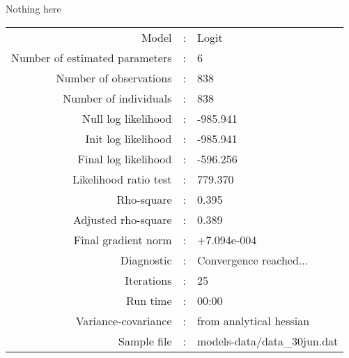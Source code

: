 Nothing here\\


\begin{flushleft}
\begin{tabular}{rcl}
\hline
Model &:& Logit\\
Number of estimated parameters&:&6\\
Number of  observations &:& 838\\
Number of individuals&:&838\\
Null log likelihood&:&-985.941\\
Init log likelihood&:&-985.941\\
Final log likelihood&:&-596.256\\
Likelihood ratio test &:&779.370\\
Rho-square&:&0.395\\
Adjusted rho-square&:&0.389\\
Final gradient norm&:&+7.094e-004\\
Diagnostic&:&Convergence reached...\\
Iterations&:&25\\
Run time&:&00:00\\
Variance-covariance&:&from analytical hessian
\\
Sample file&:&models-data/data_30jun.dat\\
\end{tabular}
\end{flushleft}
